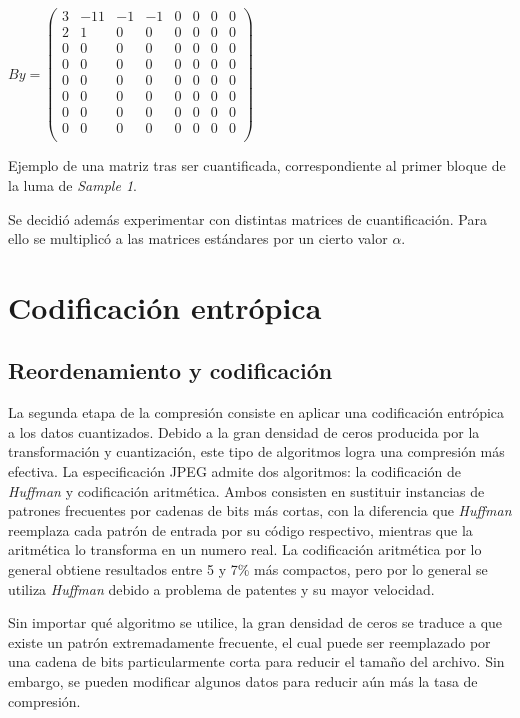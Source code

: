 \documentclass[%
	final,
	reprint,
	notitlepage,
	narroweqnarray,
	inline,
	twoside,
	invited
	]{ieee}
\begin{document}
\( By = 
\begin{pmatrix}
3 & -11 & -1 & -1 & 0 & 0 & 0 & 0 \\
2 & 1 & 0 & 0 & 0 & 0 & 0 & 0 \\
0 & 0 & 0 & 0 & 0 & 0 & 0 & 0 \\ 
0 & 0 & 0 & 0 & 0 & 0 & 0 & 0 \\ 
0 & 0 & 0 & 0 & 0 & 0 & 0 & 0 \\
0 & 0 & 0 & 0 & 0 & 0 & 0 & 0  \\ 
0 & 0 & 0 & 0 & 0 & 0 & 0 & 0 \\
0 & 0 & 0 & 0 & 0 & 0 & 0 & 0 \\ 
\end{pmatrix}\)

\begin{center} Ejemplo de una matriz tras ser cuantificada, correspondiente al primer bloque de la luma de \textit{Sample 1}.
\end{center}

\par Se decidió además experimentar con distintas matrices de cuantificación. Para ello se multiplicó a las 
matrices estándares por un cierto valor $\alpha$.

\section{Codificación entrópica}

\subsection{Reordenamiento y codificación}

\par La segunda etapa de la compresión consiste en aplicar una codificación entrópica a los datos cuantizados. Debido 
a la gran densidad de ceros producida por la transformación y cuantización, este tipo de algoritmos logra 
una compresión más efectiva. La especificación JPEG admite dos algoritmos: la codificación de \textit{Huffman} y 
codificación aritmética. Ambos consisten en sustituir instancias de patrones frecuentes por cadenas de bits 
más cortas, con la diferencia que \textit{Huffman} reemplaza cada patrón de entrada por su código respectivo, 
mientras que la aritmética lo transforma en un numero real. La codificación aritmética por lo general obtiene 
resultados entre 5 y 7\% más compactos, pero por lo general se utiliza \textit{Huffman} debido a problema de patentes 
y su mayor velocidad.
\par Sin importar qué algoritmo se utilice, la gran densidad de ceros se traduce a que existe un patrón extremadamente 
frecuente, el cual puede ser reemplazado por una cadena de bits particularmente corta para reducir el tamaño del 
archivo. Sin embargo, se pueden modificar algunos datos para reducir aún más la tasa de compresión.
\end{document}
